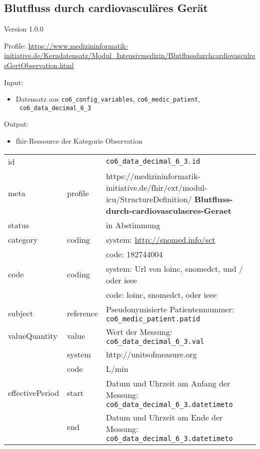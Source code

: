 \subsection{Blutfluss durch cardiovasculäres Gerät} 
\noindent Version 1.0.0

\noindent Profile: \url{https://www.medizininformatik-initiative.de/Kerndatensatz/Modul_Intensivmedizin/BlutflussdurchcardiovasculresGertObservation.html}

\noindent Input:
\begin{itemize}
	\item Datensatz aus \texttt{co6\_config\_variables}, \texttt{co6\_medic\_patient}, \\ \texttt{
co6\_data\_decimal\_6\_3}
\end{itemize}
Output:
\begin{itemize}
        \item \ac{fhir}-Ressource der Kategorie \glqq Observation\grqq{}
\end{itemize}
\begin{longtable}{|l|l|p{7.5cm}|}
        \hline
        \rowcolor{lightgray} \multicolumn{3}{|l|}{Data Mapping (inhaltlich)} \\ \hline
        id &  & \texttt{co6\_data\_decimal\_6\_3.id} \\ \hline
	meta & profile & https://medizininformatik-initiative.de/fhir/ext/modul-icu/StructureDefinition/\textbf{
Blutfluss-durch-cardiovasculaeres-Geraet} \\ \hline 
	status &  & in Abstimmung  \\ \hline 
	category & coding & system: \url{http://snomed.info/sct} \\
\cline{3-3}
	& & code: 182744004 \\ \hline
	code & coding & system: Url von \ac{loinc}, \ac{snomedct}, und / oder \ac{ieee} \\ 
	\cline{3-3} 
	 &  & code: \ac{loinc}, \ac{snomedct}, oder \ac{ieee} \\ \hline
	subject & reference & Pseudonymisierte Patientennummer: \texttt{co6\_medic\_patient.patid} \\ \hline
	valueQuantity & value & Wert der Messung: \texttt{
co6\_data\_decimal\_6\_3.val} \\
        \cline{2-3}
         & system & http://unitsofmeasure.org \\
         \cline{2-3}
         & code & L/min
\\ \hline
    effectivePeriod & start & Datum und Uhrzeit am Anfang der Messung: \texttt{
co6\_data\_decimal\_6\_3.datetimeto} \\
    \cline{2-3}
     & end & Datum und Uhrzeit am Ende der Messung: \texttt{
co6\_data\_decimal\_6\_3.datetimeto} \\ \hline
\end{longtable}


